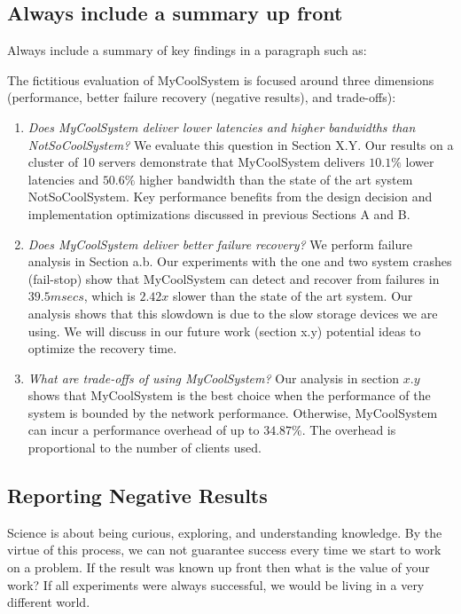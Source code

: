 \documentclass[11pt]{article}
\begin{document}
\subsection*{Always include a summary up front}
Always include a summary of key findings in a paragraph such as: 
\begin{tcolorbox}[colback=green!5,colframe=gray!40!black,title=Example of Evaluation Summary]
The fictitious evaluation of MyCoolSystem is focused around three dimensions (performance, better failure recovery (negative results), and trade-offs): 
\begin{enumerate}
    \item \textit{Does MyCoolSystem deliver lower latencies and higher bandwidths than NotSoCoolSystem?} We evaluate this question in Section X.Y. Our results on a cluster of 10 servers demonstrate that MyCoolSystem delivers $10.1\%$ lower latencies and $50.6\%$ higher bandwidth than the state of the art system NotSoCoolSystem. Key performance benefits from the design decision and implementation optimizations discussed in previous Sections A and B. 
    
    \item \textit{Does MyCoolSystem deliver better failure recovery?} We perform failure analysis in Section a.b. Our experiments with the one and two system crashes (fail-stop) show that MyCoolSystem can detect and recover from failures in $39.5msecs$, which is $2.42x$ slower than the state of the art system. Our analysis shows that this slowdown is due to the slow storage devices we are using. We will discuss in our future work (section x.y) potential ideas to optimize the recovery time. 
    
    \item \textit{What are trade-offs of using MyCoolSystem?} Our analysis in section $x.y$ shows that MyCoolSystem is the best choice when the performance of the system is bounded by the  network performance. Otherwise, MyCoolSystem can incur a performance overhead of up to $34.87\%$. The overhead is proportional to the number of clients used. 
\end{enumerate}
\end{tcolorbox}

\subsection{Reporting Negative Results}
Science is about being curious, exploring, and understanding knowledge. By the virtue of this process, we can not guarantee success every time we start to work on a problem. If the result was known up front then what is the value of your work? If all experiments were always successful, we would be living in a very different world. 
\end{document}
